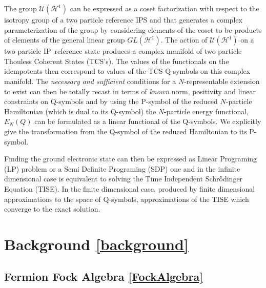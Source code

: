 \documentclass[aps,preprint]{revtex4}%
\begin{document}
The group $\mathcal{U}\left(  \mathcal{H}^{1}\right)  $ can be expressed as a
coset factorization with respect to the isotropy group of a two particle
reference IPS and that generates a complex parameterization of the group by
considering elements of the coset to be products of elements of the general
linear group $GL\left(  \mathcal{H}^{1}\right)  $. The action of
$\mathcal{U}\left(  \mathcal{H}^{1}\right)  $ on a two particle IP\ reference
state produces a complex manifold of two particle Thouless Coherent States
(TCS's). The values of the functionals on the idempotents then correspond to
values of the TCS Q-symbols on this complex manifold. The \emph{necessary and
sufficient }conditions for a $N$-representable extension to exist can then be
totally recast in terms of \emph{known }norm, positivity and linear
constraints on Q-symbols and by using the P-symbol of the reduced $N$-particle
Hamiltonian (which is dual to its Q-symbol) the $N$-particle energy
functional, $E_{N}\left(  Q\right)  $ can be formulated as a linear functional
of the Q-symbols. We explicitly give the transformation from the Q-symbol of
the reduced Hamiltonian to its P-symbol.

Finding the ground electronic state can then be expressed as Linear Programing
(LP) problem or a Semi Definite Programing (SDP) one and in the infinite
dimensional case is equivalent to solving the Time Independent Schr\H{o}dinger
Equation (TISE). In the finite dimensional case, produced by finite
dimensional approximations to the space of Q-symbols, approximations of the
TISE which converge to the exact solution.

\section{Background \ref{background}}

\subsection{Fermion Fock Algebra \ref{FockAlgebra}}
\end{document}
